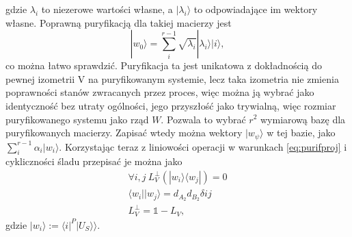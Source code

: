 \documentclass[10pt]{article} %
\newcommand{\Ket}[1]{|#1\rangle}
\newcommand{\Bra}[1]{\langle#1|}
\newcommand{\KKet}[1]{|#1\rangle\rangle}
\newcommand{\I}{\mathbb{1}}
\begin{document}
gdzie $\lambda_i$ to niezerowe wartości własne, a $\Ket{\lambda_i}$ to odpowiadające im wektory własne.
Poprawną puryfikacją dla takiej macierzy jest
\begin{equation}
\Ket{w_0} = \sum^{r-1}_i \sqrt{\lambda_i} \Ket{\lambda_i} \Ket{i},
\end{equation}
co można łatwo sprawdzić. Puryfikacja ta jest unikatowa z dokładnością do pewnej izometrii V na puryfikowanym systemie, lecz taka izometria nie zmienia
poprawności stanów zwracanych przez proces, więc można ją wybrać jako identyczność bez utraty ogólności, jego przyszłość jako trywialną, więc rozmiar puryfikowanego systemu jako rząd $W$. Pozwala to wybrać $r^2$ wymiarową bazę dla puryfikowanych macierzy. Zapisać wtedy można wektory
$\Ket{w_\psi}$ w tej bazie, jako $\sum^{r-1}_i \alpha_i \Ket{w_i}$. Korzystając teraz z liniowości operacji w warunkach \eqref{eq:purifproj} i cykliczności śladu przepisać je można jako
\begin{gather}
\forall i,j ~L^\perp_V\left(\Ket{w_i}\Bra{w_j}\right) = 0 \nonumber\\
\Bra{w_i}\Ket{w_j} = d_{A_2}d_{B_2}\delta{ij} \\
L^\perp_V = \I - L_V \nonumber,
\end{gather} gdzie $\Ket{w_i} := \Bra{i}^P \KKet{U_S}$.
\end{document}
